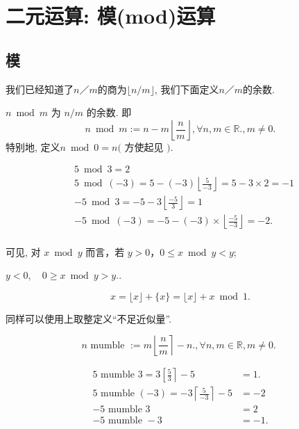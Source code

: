 \documentclass{ctexart}
\begin{document}
\section{二元运算: 模(mod)运算}

\subsection{模} 我们已经知道了$n／m$的商为$\lfloor n / m\rfloor$, 我们下面定义$n／m$的余数. 

\begin{definition}
$n \bmod m$ 为 $n / m$ 的余数. 即     
$$
n \bmod m:=n-m\left\lfloor\frac{n}{m}\right\rfloor, \forall n, m \in \mathbb{R} ., m \neq 0 .
$$
特别地, 定义$n \bmod 0=n($ 方使起见 $)$. 

\end{definition}

\begin{example}
    $$
\begin{aligned}
& 5 \bmod 3=2 \\
& 5 \bmod (-3)=5-(-3)\left\lfloor\frac{5}{-3}\right\rfloor=5-3 \times 2=-1 \\
& -5 \bmod 3=-5-3\left\lfloor\frac{-5}{3}\right\rfloor=1 \\
& -5 \bmod (-3)=-5-(-3) \times\left\lfloor\frac{-5}{-3}\right\rfloor=-2 . \\
&
\end{aligned}
$$

可见, 对 $x \bmod y$ 而言，若 $y>0 ， 0 \leqslant x \bmod y<y$; 

$y<0, \quad 0 \geqslant x \bmod y>y .$. 
\end{example}

\begin{example}
    $$
x=\lfloor x\rfloor+\{x\}=\lfloor x\rfloor+x \bmod 1 .
$$
    
\end{example}

同样可以使用上取整定义``不足近似量''.

\begin{definition}
    $$
n \text { mumble }:=m\left\lfloor\frac{n}{m}\right\rceil-n ., \forall n, m \in \mathbb{R}, m \neq 0 \text {. }
$$
    
\end{definition}


\begin{example}
    $$
\begin{aligned}
5 \text { mumble } 3=3\left[\frac{5}{3}\right\rceil-5 & =1 . \\
5 \text { mumble }(-3)=-3\left\lceil\frac{5}{-3}\right\rceil-5 & =-2 \\
-5 \text { mumble } 3 & =2 \\
-5 \text { mumble }-3 \quad & =-1 .
\end{aligned}
$$
    
\end{example}
\end{document}
